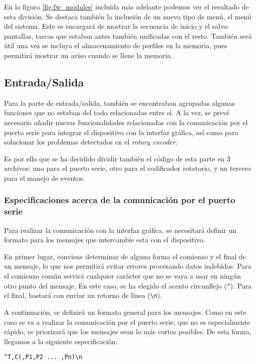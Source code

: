 En la figura \ref{fig:fw_modules} incluida más adelante podemos ver el resultado de esta división. Se destaca también la inclusión de un nuevo tipo de menú, el menú del sistema. Este se encargará de mostrar la secuencia de inicio y el salva-pantallas, tareas que estaban antes también unificadas con el resto. También será útil una vez se incluya el almacenamiento de perfiles en la memoria, pues permitirá mostrar un aviso cuando se llene la memoria.

\subsection{Entrada/Salida}

Para la parte de entrada/salida, también se encontraban agrupadas algunas funciones que no estaban del todo relacionadas entre sí. A la vez, se prevé necesario añadir nuevas funcionalidades relacionadas con la comunicación por el puerto serie para integrar el dispositivo con la interfaz gráfica, así como para solucionar los problemas detectados en el \textit{rotary encoder}.

Es por ello que se ha decidido dividir también el código de esta parte en 3 archivos: uno para el puerto serie, otro para el codificador rotatorio, y un tercero para el manejo de eventos.

\subsubsection{Especificaciones acerca de la comunicación por el puerto serie}

Para realizar la comunicación con la interfaz gráfica, se necesitará definir un formato para los mensajes que intercambie esta con el dispositivo.

En primer lugar, conviene determinar de alguna forma el comienzo y el final de un mensaje, lo que nos permitirá evitar errores procesando datos indebidos. Para el comienzo común servirá cualquier carácter que no se vaya a usar en ningún otro punto del mensaje. En este caso, se ha elegido el acento circunflejo (\verb|^|). Para el final, bastará con enviar un retorno de línea (\verb|\n|).

A continuación, se definirá un formato general para los mensajes. Como en este caso se va a realizar la comunicación por el puerto serie, que no es especialmente rápido, se priorizará que los mensajes sean lo más cortos posibles. De esta forma, llegamos a la siguiente especificación:

\begin{center}
    {\selectfont\verb|^T,C(,P1,P2 ... ,Pn)\n|}
\end{center}

